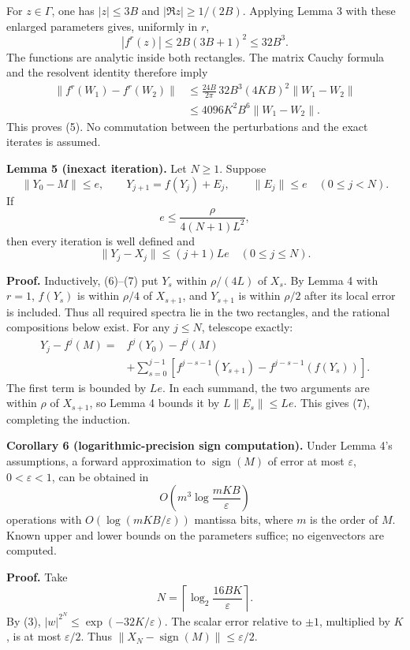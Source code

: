 \documentclass[10pt,a4paper]{article}
\begin{document}
For \(z\in\Gamma\), one has \(|z|\le3B\) and \(|\Re z|\ge1/(2B)\).
Applying Lemma 3 with these enlarged parameters gives, uniformly in
\(r\), \[
 |f^r(z)|\le2B(3B+1)^2\le32B^3.
\] The functions are analytic inside both rectangles. The matrix Cauchy
formula and the resolvent identity therefore imply \[
 \begin{aligned}
 \|f^r(W_1)-f^r(W_2)\|
 &\le\frac{24B}{2\pi}\,32B^3(4KB)^2\|W_1-W_2\|\\
 &\le4096K^2B^6\|W_1-W_2\|.
 \end{aligned}
\] This proves (5). No commutation between the perturbations and the
exact iterates is assumed.

\textbf{Lemma 5 (inexact iteration).} Let \(N\ge1\). Suppose \[
 \|Y_0-M\|\le e,
 \qquad Y_{j+1}=f(Y_j)+E_j,
 \qquad\|E_j\|\le e\quad(0\le j<N).
\] If \[
 e\le\frac{\rho}{4(N+1)L^2},
 \tag{6}
\] then every iteration is well defined and \[
 \|Y_j-X_j\|\le(j+1)Le\quad(0\le j\le N).
 \tag{7}
\]

\textbf{Proof.} Inductively, (6)--(7) put \(Y_s\) within \(\rho/(4L)\)
of \(X_s\). By Lemma 4 with \(r=1\), \(f(Y_s)\) is within \(\rho/4\) of
\(X_{s+1}\), and \(Y_{s+1}\) is within \(\rho/2\) after its local error
is included. Thus all required spectra lie in the two rectangles, and
the rational compositions below exist. For any \(j\le N\), telescope
exactly: \[
 \begin{aligned}
 Y_j-f^j(M)
 ={}&f^j(Y_0)-f^j(M)\\
 &+\sum_{s=0}^{j-1}\left[
 f^{j-s-1}(Y_{s+1})-
 f^{j-s-1}(f(Y_s))\right].
 \end{aligned}
 \tag{8}
\] The first term is bounded by \(Le\). In each summand, the two
arguments are within \(\rho\) of \(X_{s+1}\), so Lemma 4 bounds it by
\(L\|E_s\|\le Le\). This gives (7), completing the induction.

\textbf{Corollary 6 (logarithmic-precision sign computation).} Under
Lemma 4's assumptions, a forward approximation to
\(\operatorname{sign}(M)\) of error at most \(\varepsilon\),
\(0<\varepsilon<1\), can be obtained in \[
 O\!\left(m^3\log\frac{mKB}{\varepsilon}\right)
\] operations with \(O(\log(mKB/\varepsilon))\) mantissa bits, where
\(m\) is the order of \(M\). Known upper and lower bounds on the
parameters suffice; no eigenvectors are computed.

\textbf{Proof.} Take \[
 N=\left\lceil\log_2\frac{16BK}{\varepsilon}\right\rceil.
 \tag{9}
\] By (3), \(|w|^{2^N}\le\exp(-32K/\varepsilon)\). The scalar error
relative to \(\pm1\), multiplied by \(K\), is at most \(\varepsilon/2\).
Thus \(\|X_N-\operatorname{sign}(M)\|\le\varepsilon/2\).
\end{document}
